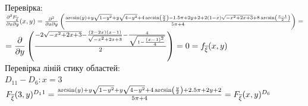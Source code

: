 \documentclass[14pt,a4paper]{scrartcl}
\theoremstyle{definition}
\theoremstyle{remark}
\theoremstyle{definition}
\theoremstyle{definition}
\begin{document}
Перевірка:\\
$\frac{\partial^2 F_{\overline{\xi}}}{\partial x \partial y}(x,y) =
\frac{\partial^2}{\partial x \partial y} \left(  \frac{\arcsin\left(y\right)+y\sqrt{1-y^2}+  y  \sqrt{4-y^2}+4\arcsin\left(\frac{y}{2}\right)-  1.5\pi + 2y + 2 +2\left(1-x\right)\sqrt{-x^2+2x+3}+8\arcsin\left(\frac{x-1}{2}\right) }{5\pi + 4}
\right) =$\\
$ = \dfrac{\partial}{ \partial y} \left( \frac{-2\sqrt{-x^2+2x+3}-\frac{\left(2-2x\right)\left(x-1\right)}{\sqrt{-x^2+2x+3}}-\frac{4}{\sqrt{1-\frac{\left(x-1\right)^2}{4}}}}{2} \right)  = 0=f_{\overline{\xi}} (x,y)$\\

Перевірка ліній стику областей:\\
$D_{11} - D_6 : x = 3$\\
$ F_{\overline{\xi}} (3,y)^{D_11} = \frac{\arcsin\left(y\right)+y\sqrt{1-y^2}+  y  \sqrt{4-y^2}+4\arcsin\left(\frac{y}{2}\right) + 2.5\pi + 2y + 2}{5\pi + 4}  = F_{\overline{\xi}} (x,y)^{D_6}$\\
\newpage
\end{document}
